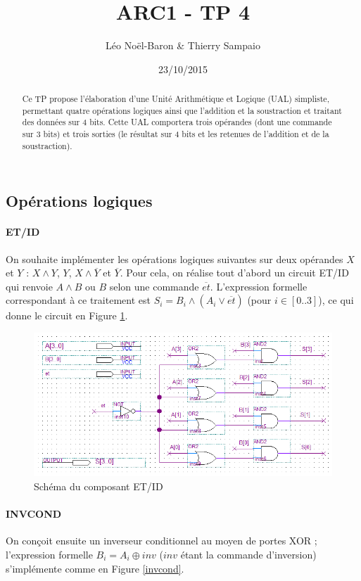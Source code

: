 \documentclass[a4paper,11pt]{article}
\title{ARC1 - TP 4}
\author{Léo Noël-Baron \& Thierry Sampaio}
\date{23/10/2015}
\begin{document}
\maketitle

\begin{abstract}
	Ce TP propose l'élaboration d'une Unité Arithmétique et Logique (UAL) simpliste, permettant quatre opérations logiques ainsi que l'addition et la soustraction et traitant des données sur 4 bits. Cette UAL comportera trois opérandes (dont une commande sur 3 bits) et trois sorties (le résultat sur 4 bits et les retenues de l'addition et de la soustraction).
\end{abstract}

\subsection*{Opérations logiques}

\paragraph{ET/ID} On souhaite implémenter les opérations logiques suivantes sur deux opérandes $X$ et $Y$ : $X\wedge Y$, $Y$, $X\wedge \overline{Y}$ et $\overline{Y}$. Pour cela, on réalise tout d'abord un circuit ET/ID qui renvoie $A\wedge B$ ou $B$ selon une commande $\overline{et}$. L'expression formelle correspondant à ce traitement est $S_i=B_i\wedge (A_i\vee\overline{et})$ (pour $i\in[0..3]$), ce qui donne le circuit en Figure \ref{etid}.

\begin{figure}[h]
	\center
	\includegraphics[scale=0.75]{etid.png}
	\caption{Schéma du composant ET/ID}
	\label{etid}
\end{figure}

\paragraph{INVCOND} On conçoit ensuite un inverseur conditionnel au moyen de portes XOR ; l'expression formelle $B_i=A_i\oplus inv$ ($inv$ étant la commande d'inversion) s'implémente comme en Figure \ref{invcond}.
\end{document}
